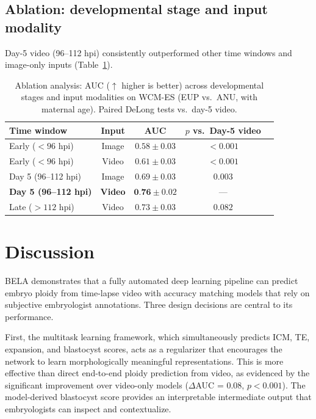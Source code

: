 \documentclass[11pt]{article}
\begin{document}
\subsection{Ablation: developmental stage and input modality}

Day-5 video (96--112 hpi) consistently outperformed other time windows and image-only inputs (Table~\ref{tab:ablation}).

\begin{table}[H]
\centering
\caption{Ablation analysis: AUC ($\uparrow$ higher is better) across developmental stages and input modalities on WCM-ES (EUP vs.\ ANU, with maternal age). Paired DeLong tests vs.\ day-5 video.}
\label{tab:ablation}
\begin{tabular}{lcccc}
\toprule
\textbf{Time window} & \textbf{Input} & \textbf{AUC} & \textbf{$p$ vs.\ Day-5 video} \\
\midrule
Early ($< 96$ hpi) & Image & $0.58 \pm 0.03$ & $< 0.001$ \\
Early ($< 96$ hpi) & Video & $0.61 \pm 0.03$ & $< 0.001$ \\
Day 5 (96--112 hpi) & Image & $0.69 \pm 0.03$ & $0.003$ \\
\textbf{Day 5 (96--112 hpi)} & \textbf{Video} & $\textbf{0.76} \pm 0.02$ & --- \\
Late ($> 112$ hpi) & Video & $0.73 \pm 0.03$ & $0.082$ \\
\bottomrule
\end{tabular}
\end{table}

\section{Discussion}

BELA demonstrates that a fully automated deep learning pipeline can predict embryo ploidy from time-lapse video with accuracy matching models that rely on subjective embryologist annotations. Three design decisions are central to its performance.

First, the multitask learning framework, which simultaneously predicts ICM, TE, expansion, and blastocyst scores, acts as a regularizer that encourages the network to learn morphologically meaningful representations. This is more effective than direct end-to-end ploidy prediction from video, as evidenced by the significant improvement over video-only models ($\Delta$AUC = 0.08, $p < 0.001$). The model-derived blastocyst score provides an interpretable intermediate output that embryologists can inspect and contextualize.
\end{document}
